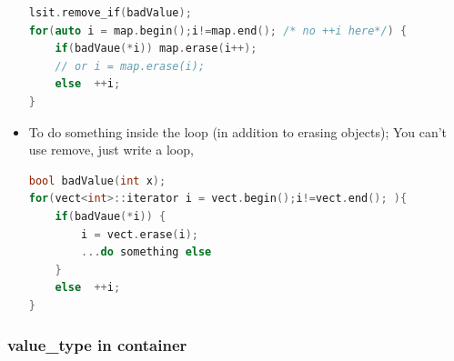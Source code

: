 \documentclass[a4paper,12pt,twoside]{book}
\begin{document}
\begin{itemize}
\begin{lstlisting}[frame=single, language=c++]
lsit.remove_if(badValue);
for(auto i = map.begin();i!=map.end(); /* no ++i here*/) {
	if(badVaue(*i)) map.erase(i++);
	// or i = map.erase(i);
	else  ++i;
}
\end{lstlisting}

\item  To do something inside the loop (in addition to erasing objects);  You can't use remove, just write a loop,
\begin{lstlisting}[frame=single, language=c++]
bool badValue(int x);
for(vect<int>::iterator i = vect.begin();i!=vect.end(); ){
	if(badVaue(*i)) {
		i = vect.erase(i);
		...do something else
	}
	else  ++i;
}
\end{lstlisting}

\end{itemize}
\subsubsection{value\_type in container}
\end{document}

